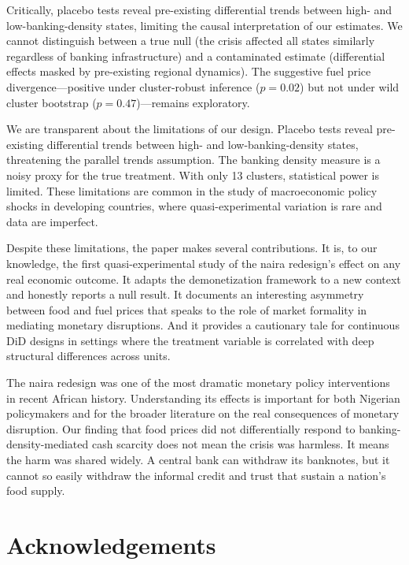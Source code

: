 \documentclass[12pt]{article}
\begin{document}
Critically, placebo tests reveal pre-existing differential trends between high- and low-banking-density states, limiting the causal interpretation of our estimates. We cannot distinguish between a true null (the crisis affected all states similarly regardless of banking infrastructure) and a contaminated estimate (differential effects masked by pre-existing regional dynamics). The suggestive fuel price divergence---positive under cluster-robust inference ($p = 0.02$) but not under wild cluster bootstrap ($p = 0.47$)---remains exploratory.

We are transparent about the limitations of our design. Placebo tests reveal pre-existing differential trends between high- and low-banking-density states, threatening the parallel trends assumption. The banking density measure is a noisy proxy for the true treatment. With only 13 clusters, statistical power is limited. These limitations are common in the study of macroeconomic policy shocks in developing countries, where quasi-experimental variation is rare and data are imperfect.

Despite these limitations, the paper makes several contributions. It is, to our knowledge, the first quasi-experimental study of the naira redesign's effect on any real economic outcome. It adapts the \citet{chodorow2020cash} demonetization framework to a new context and honestly reports a null result. It documents an interesting asymmetry between food and fuel prices that speaks to the role of market formality in mediating monetary disruptions. And it provides a cautionary tale for continuous DiD designs in settings where the treatment variable is correlated with deep structural differences across units.

The naira redesign was one of the most dramatic monetary policy interventions in recent African history. Understanding its effects is important for both Nigerian policymakers and for the broader literature on the real consequences of monetary disruption. Our finding that food prices did not differentially respond to banking-density-mediated cash scarcity does not mean the crisis was harmless. It means the harm was shared widely. A central bank can withdraw its banknotes, but it cannot so easily withdraw the informal credit and trust that sustain a nation's food supply.

\section*{Acknowledgements}
\end{document}
